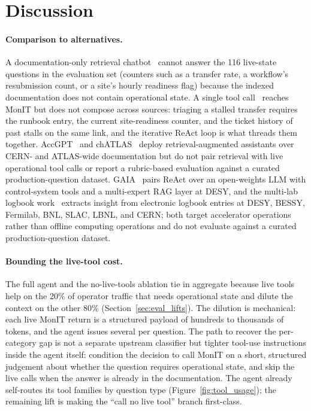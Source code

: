 \section{Discussion}
\label{sec:discussion}

\paragraph{Comparison to alternatives.}
A documentation-only retrieval chatbot~\cite{lewis2020rag} cannot
answer the 116 live-state questions in the evaluation set
(counters such as a transfer rate, a workflow's resubmission
count, or a site's hourly readiness flag) because the indexed
documentation does not contain operational state. A single tool
call~\cite{yao2023react} reaches MonIT but does not compose
across sources: triaging a stalled transfer requires the runbook
entry, the current site-readiness counter, and the ticket history
of past stalls on the same link, and the iterative ReAct loop is
what threads them together. AccGPT~\cite{accgpt2025} and
chATLAS~\cite{chatlas2025} deploy retrieval-augmented assistants
over CERN- and ATLAS-wide documentation but do not pair retrieval
with live operational tool calls or report a rubric-based
evaluation against a curated production-question dataset.
GAIA~\cite{mayet2024gaia} pairs ReAct over an open-weights LLM
with control-system tools and a multi-expert RAG layer at DESY,
and the multi-lab logbook work~\cite{sulc2024logbooks} extracts
insight from electronic logbook entries at DESY, BESSY, Fermilab,
BNL, SLAC, LBNL, and CERN; both target accelerator operations
rather than offline computing operations and do not evaluate
against a curated production-question dataset.

\paragraph{Bounding the live-tool cost.}
The full agent and the no-live-tools ablation tie in aggregate
because live tools help on the 20\% of operator traffic that
needs operational state and dilute the context on the other
80\% (Section~\ref{sec:eval_lifts}). The dilution is mechanical:
each live MonIT return is a structured payload of hundreds to
thousands of tokens, and the agent issues several per question.
The path to recover the per-category gap is not a separate
upstream classifier but tighter tool-use instructions inside the
agent itself: condition the decision to call MonIT on a
short, structured judgement about whether the question requires
operational state, and skip the live calls when the answer is
already in the documentation. The agent already self-routes its
tool families by question type
(Figure~\ref{fig:tool_usage}); the remaining lift is making the
``call no live tool'' branch first-class.

